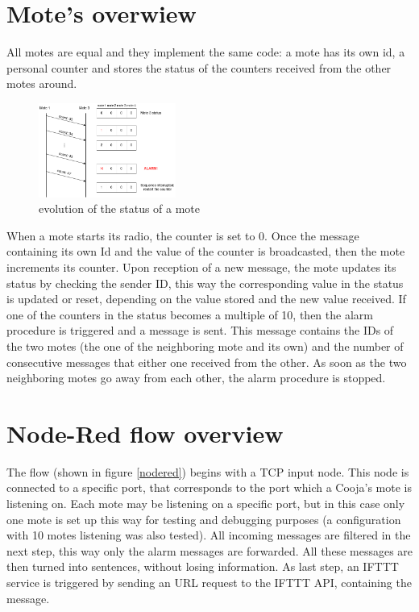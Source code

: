 \documentclass[11pt]{article}
\begin{document}
\section{Mote's overwiew}
All motes are equal and they implement the same code: \newline
a mote has its own id, a personal counter and stores the status of the counters received from the other motes around. \newline
\begin{figure}
  \begin{center}
    \includegraphics[width=0.40\textwidth]{status_update_diagram.png}
    \caption{evolution of the status of a mote}
  \end{center}
\end{figure}
When a mote starts its radio, the counter is set to 0. Once the message containing its own Id and the value of the counter is broadcasted, then the mote increments its counter. \newline
Upon reception of a new message, the mote updates its status by checking the sender ID, this way the corresponding value in the status is updated or reset, depending on the value stored and the new value received. \newline
If one of the counters in the status becomes a multiple of 10, then the alarm procedure is triggered and a message is sent. This message contains the IDs of the two motes (the one of the neighboring mote and its own) and the number of consecutive messages that either one received from the other. \newline
As soon as the two neighboring motes go away from each other, the alarm procedure is stopped.

\section{Node-Red flow overview}
The flow (shown in figure \ref{nodered}) begins with a TCP input node. This node is connected to a specific port, that corresponds to the port which a Cooja's mote is listening on. Each mote may be listening on a specific port, but in this case only one mote is set up this way for testing and debugging purposes (a configuration with 10 motes listening was also tested). \newline
All incoming messages are filtered in the next step, this way only the alarm messages are forwarded. All these messages are then turned into sentences, without losing information. \newline
As last step, an IFTTT service is triggered by sending an URL request to the IFTTT API, containing the message.
\end{document}
